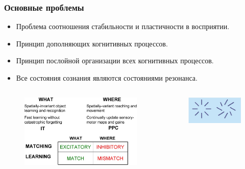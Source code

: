 \documentclass[default]{beamer}
\begin{document}
	\begin{frame}
		\frametitle{Основные проблемы}
		
		\begin{itemize}
			\item Проблема соотношения стабильности и пластичности в восприятии.
			\item Принцип дополняющих когнитивных процессов.
			\item Принцип послойной организации всех когнитивных процессов.
			\item Все состояния сознания являются состояниями резонанса.
		\end{itemize}
		
		\begin{columns}
			\begin{column}{0.5\textwidth}
				\begin{figure}
					\includegraphics[width=\textwidth]{grossberg_compl}
				\end{figure}
			\end{column}
			\begin{column}{0.5\textwidth}
				\begin{figure}
					\includegraphics[width=\textwidth]{art_illus}
				\end{figure}
			\end{column}
		\end{columns}
	\end{frame}	
\end{document}
